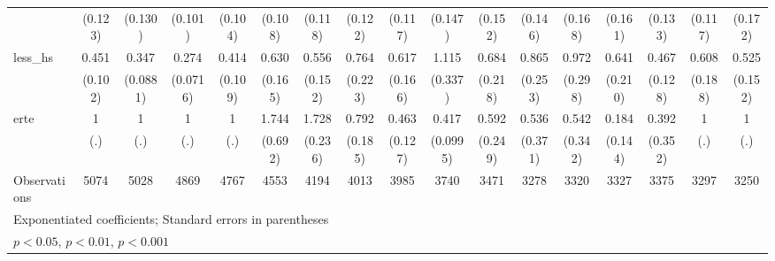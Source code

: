 {\begin{tabular}{l*{16}{c}}
                    &     (0.123)         &     (0.130)         &     (0.101)         &     (0.104)         &     (0.108)         &     (0.118)         &     (0.122)         &     (0.117)         &     (0.147)         &     (0.152)         &     (0.146)         &     (0.168)         &     (0.161)         &     (0.133)         &     (0.117)         &     (0.172)         \\
[1em]
less\_hs             &       0.451\sym{***}&       0.347\sym{***}&       0.274\sym{***}&       0.414\sym{***}&       0.630         &       0.556\sym{*}  &       0.764         &       0.617         &       1.115         &       0.684         &       0.865         &       0.972         &       0.641         &       0.467\sym{**} &       0.608         &       0.525\sym{*}  \\
                    &     (0.102)         &    (0.0881)         &    (0.0716)         &     (0.109)         &     (0.165)         &     (0.152)         &     (0.223)         &     (0.166)         &     (0.337)         &     (0.218)         &     (0.253)         &     (0.298)         &     (0.210)         &     (0.128)         &     (0.188)         &     (0.152)         \\
[1em]
erte                &           1         &           1         &           1         &           1         &       1.744         &       1.728\sym{***}&       0.792         &       0.463\sym{**} &       0.417\sym{***}&       0.592         &       0.536         &       0.542         &       0.184\sym{*}  &       0.392         &           1         &           1         \\
                    &         (.)         &         (.)         &         (.)         &         (.)         &     (0.692)         &     (0.236)         &     (0.185)         &     (0.127)         &    (0.0995)         &     (0.249)         &     (0.371)         &     (0.342)         &     (0.144)         &     (0.352)         &         (.)         &         (.)         \\
\hline
Observations        &        5074         &        5028         &        4869         &        4767         &        4553         &        4194         &        4013         &        3985         &        3740         &        3471         &        3278         &        3320         &        3327         &        3375         &        3297         &        3250         \\
\hline\hline
\multicolumn{17}{l}{\footnotesize Exponentiated coefficients; Standard errors in parentheses}\\
\multicolumn{17}{l}{\footnotesize \sym{*} \(p<0.05\), \sym{**} \(p<0.01\), \sym{***} \(p<0.001\)}\\
\end{tabular}
}
